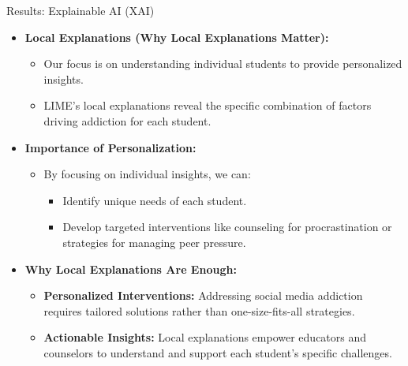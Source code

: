 \documentclass{beamer}
\begin{document}
\begin{frame}{Results: Explainable AI (XAI)}
    \begin{itemize}
        \item \textbf{Local Explanations (Why Local Explanations Matter):}
        \begin{itemize}
            \item Our focus is on understanding individual students to provide personalized insights.
            \item LIME’s local explanations reveal the specific combination of factors driving addiction for each student.
        \end{itemize}


        \item \textbf{Importance of Personalization:}
        \begin{itemize}
            \item By focusing on individual insights, we can:
            \begin{itemize}
                \item Identify unique needs of each student.
                \item Develop targeted interventions like counseling for procrastination or strategies for managing peer pressure.
            \end{itemize}
        \end{itemize}

        \item \textbf{Why Local Explanations Are Enough:}
        \begin{itemize}
            \item \textbf{Personalized Interventions:} Addressing social media addiction requires tailored solutions rather than one-size-fits-all strategies.
            \item \textbf{Actionable Insights:} Local explanations empower educators and counselors to understand and support each student's specific challenges.
        \end{itemize}
    \end{itemize}
\end{frame}
\end{document}
